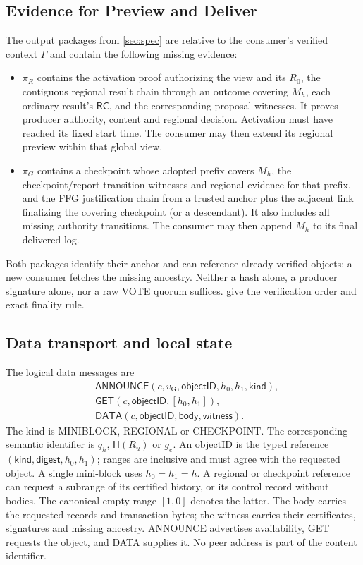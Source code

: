 \documentclass[11pt,a4paper,onecolumn]{article}
\newcommand{\Hash}{\mathsf H}
\newcommand{\RC}{\mathsf{RC}}
\newcommand{\gv}{v_{\mathrm G}}
\newcommand{\Tag}[1]{\mathsf{#1}}
\theoremstyle{remark}\newtheorem{example}[definition]{Example}
\begin{document}
\subsection{Evidence for Preview and Deliver}\label{sec:consumerproofs}
The output packages from \cref{sec:spec} are relative to the consumer's
verified context $\Gamma$ and contain the following missing evidence:
\begin{itemize}
\item $\pi_R$ contains the activation proof authorizing the view and its $R_0$,
the contiguous regional result chain through an outcome covering $M_h$, each
ordinary result's $\RC$, and the corresponding proposal witnesses. It proves
producer authority, content and regional decision. Activation must have
reached its fixed start time. The consumer may then extend its regional
preview within that global view.
\item $\pi_G$ contains a checkpoint whose adopted prefix covers $M_h$, the
checkpoint/report transition witnesses and regional evidence for that prefix,
and the FFG justification chain from a trusted anchor plus the adjacent link
finalizing the covering checkpoint (or a descendant). It also includes all
missing authority transitions. The consumer may then append $M_h$ to its
final delivered log.
\end{itemize}
Both packages identify their anchor and can reference already verified objects;
a new consumer fetches the missing ancestry. Neither a hash alone, a producer
signature alone, nor a raw VOTE quorum suffices. 
give the verification order and exact finality rule.

\subsection{Data transport and local state}\label{sec:transport}
The logical data messages are
\begin{align*}
 &\Tag{ANNOUNCE}(c,\gv,\mathsf{objectID},h_0,h_1,\mathsf{kind}),\\
 &\Tag{GET}(c,\mathsf{objectID},[h_0,h_1]),\\
 &\Tag{DATA}(c,\mathsf{objectID},\mathsf{body},\mathsf{witness}).
\end{align*}
The kind is MINIBLOCK, REGIONAL or CHECKPOINT. The corresponding semantic
identifier is $q_h$, $\Hash(R_u)$ or $g_e$. An objectID is the typed reference
$(\mathsf{kind},\mathsf{digest},h_0,h_1)$; ranges are inclusive and must agree
with the requested object. A single mini-block uses $h_0=h_1=h$. A regional
or checkpoint reference can request a subrange of its certified history, or
its control record without bodies. The canonical empty range $[1,0]$ denotes
the latter.
The body carries the requested records and transaction bytes; the witness
carries their certificates, signatures and missing ancestry. ANNOUNCE advertises
availability, GET requests the object, and DATA supplies it. No peer address is
part of the content identifier.
\end{document}

